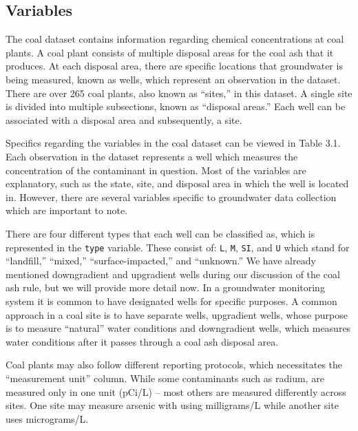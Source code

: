 \documentclass[12pt, twoside]{amherstthesis}
\begin{document}
\hypertarget{variables}{%
\subsection{Variables}\label{variables}}

The coal dataset contains information regarding chemical concentrations at coal plants. A coal plant consists of multiple disposal areas for the coal ash that it produces. At each disposal area, there are specific locations that groundwater is being measured, known as wells, which represent an observation in the dataset. There are over 265 coal plants, also known as ``sites,'' in this dataset. A single site is divided into multiple subsections, known as ``disposal areas.'' Each well can be associated with a disposal area and subsequently, a site.

Specifics regarding the variables in the coal dataset can be viewed in Table 3.1. Each observation in the dataset represents a well which measures the concentration of the contaminant in question. Most of the variables are explanatory, such as the state, site, and disposal area in which the well is located in. However, there are several variables specific to groundwater data collection which are important to note.

There are four different types that each well can be classified as, which is represented in the \texttt{type} variable. These consist of: \texttt{L}, \texttt{M}, \texttt{SI}, and \texttt{U} which stand for ``landfill,'' ``mixed,'' ``surface-impacted,'' and ``unknown.'' We have already mentioned downgradient and upgradient wells during our discussion of the coal ash rule, but we will provide more detail now. In a groundwater monitoring system it is common to have designated wells for specific purposes. A common approach in a coal site is to have separate wells, upgradient wells, whose purpose is to measure ``natural'' water conditions and downgradient wells, which measures water conditions after it passes through a coal ash disposal area.

Coal plants may also follow different reporting protocols, which necessitates the ``measurement unit'' column. While some contaminants such as radium, are measured only in one unit (pCi/L) -- most others are measured differently across sites. One site may measure arsenic with using milligrams/L while another site uses micrograms/L.
\end{document}
